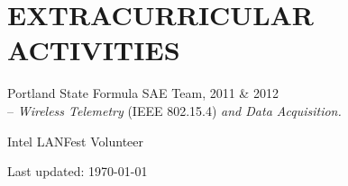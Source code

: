 \documentclass{article}
\renewenvironment{itemize}{
	\begin{list}{}{
		\setlength{\leftmargin}{1.5em}
		\setlength{\itemsep}{0.25em}
		\setlength{\parskip}{0pt}
		\setlength{\parsep}{0.25em}
	}
}{
	\end{list}
}
\begin{document}
\section*{EXTRACURRICULAR ACTIVITIES}
	\begin{itemize}
		\item Portland State Formula SAE Team, 2011 \& 2012 \\
			-- \textit{Wireless Telemetry} (IEEE 802.15.4) \textit{and Data Acquisition.}
		\item Intel LANFest Volunteer
	\end{itemize}

\begin{center}
	\begin{small}
		Last updated: \today
	\end{small}
\end{center}
\end{document}
